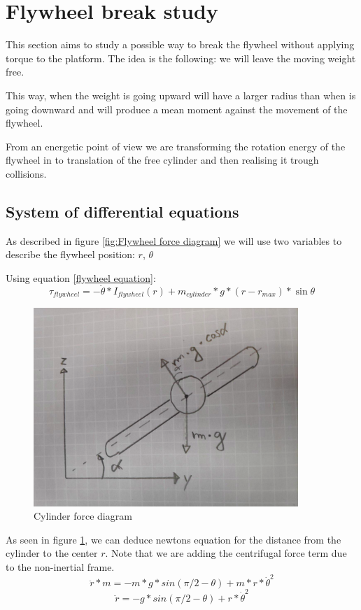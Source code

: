 \section{Flywheel break study}

This section aims to study a possible way to break the flywheel without applying torque to the platform. The idea is the following: we will leave the moving weight free.

This way, when the weight is going upward will have a larger radius than when is going downward and will produce a mean moment against the movement of the flywheel.

From an energetic point of view we are transforming the rotation energy of the flywheel in to translation of the free cylinder and then realising it trough collisions.
\subsection{System of differential equations}
As described in figure \ref{fig:Flywheel force diagram} we will use two variables to describe the flywheel position: $r$, $\theta$ 

Using equation \ref{flywheel equation}:
\[\tau_{flywheel} = -\ddot{\theta}*I_{flywheel}(r) + m_{cylinder} * g * (r - r_{max}) * \sin{\theta}\]
\begin{figure}[ht]
	\centering
	\includegraphics[width=10cm]{img/cylinder_forces.png}
	\caption{Cylinder force diagram}
	\label{fig:Cylinder force diagram}
\end{figure}

As seen in figure \ref{fig:Cylinder force diagram}, we can deduce newtons equation for the distance from the cylinder to the center $r$. Note that we are adding the centrifugal force term due to the non-inertial frame.
\[\ddot{r} * m = -m * g * sin(\pi/2-\theta) + m * r * \dot{\theta}^2 \]
\[\ddot{r} = -g * sin(\pi/2-\theta) + r * \dot{\theta}^2 \]

